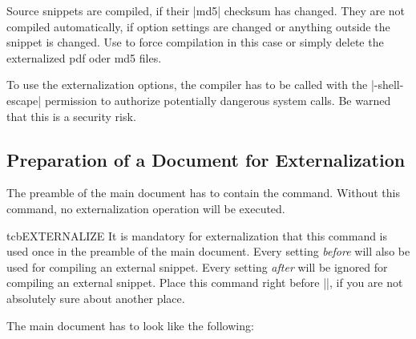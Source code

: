 \begin{marker}
Source snippets are compiled, if their |md5| checksum has changed.
They are not compiled automatically, if option settings are changed or
anything outside the snippet is changed.
Use  to force compilation in this case
or simply delete the externalized pdf oder md5 files.
\end{marker}

\begin{marker}
To use the externalization options, the compiler has to be called with the
|-shell-escape| permission to authorize potentially dangerous system calls.
Be warned that this is a security risk.
\end{marker}


\clearpage
\subsection{Preparation of a Document for Externalization}\label{subsec:external_preparation}

The preamble of the main document has to contain the 
command. Without this command, no externalization operation will be
executed.

\begin{docCommand}[doc new=2015-03-11]{tcbEXTERNALIZE}{}
  It is mandatory for externalization that this command is used once
  in the preamble of the main document. Every setting \emph{before}
   will also be used for compiling an external
  snippet. Every setting \emph{after}  will be
  ignored for compiling an external snippet.
  Place this command right before ||, if you are not
  absolutely sure about another place.

  The main document has to look like the following:

\end{docCommand}

